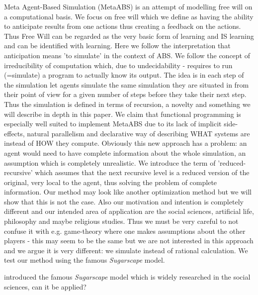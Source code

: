 Meta Agent-Based Simulation (MetaABS) is an attempt of modelling free will on a computational basis. We focus on free will which we define as having the ability to anticipate results from one actions thus creating a feedback on the actions. Thus Free Will can be regarded as the very basic form of learning and IS learning and can be identified with learning. Here we follow the interpretation that anticipation means 'to simulate' in the context of ABS. We follow the concept of irreducibility of computation which, due to undecidability - requires to run (=simulate) a program to actually know its output. The idea is in each step of the simulation let agents simulate the same simulation they are situated in from their point of view for a given number of steps before they take their next step. Thus the simulation is defined in terms of recursion, a novelty and something we will describe in depth in this paper. We claim that functional programming is especially well suited to implement MetaABS due to its lack of implicit side-effects, natural parallelism and declarative way of describing WHAT systems are instead of HOW they compute. Obviously this new approach has a problem: an agent would need to have complete information about the whole simulation, an assumption which is completely unrealistic. We introduce the term of 'reduced-recursive' which assumes that the next recursive level is a reduced version of the original, very local to the agent, thus solving the problem of complete information.
Our method may look like another optimization method but we will show that this is not the case. Also our motivation and intention is completely different and our intended area of application are the social sciences, artificial life, philosophy and maybe religious studies. Thus we must be very careful to not confuse it with e.g. game-theory where one makes assumptions about the other players - this may seem to be the same but we are not interested in this approach and we argue it is very different: we simulate instead of rational calculation. We test our method using the famous \textit{Sugarscape} model.

\cite{epstein_growing_1996} introduced the famous \textit{Sugarscape} model which is widely researched in the social sciences, can it be applied?

